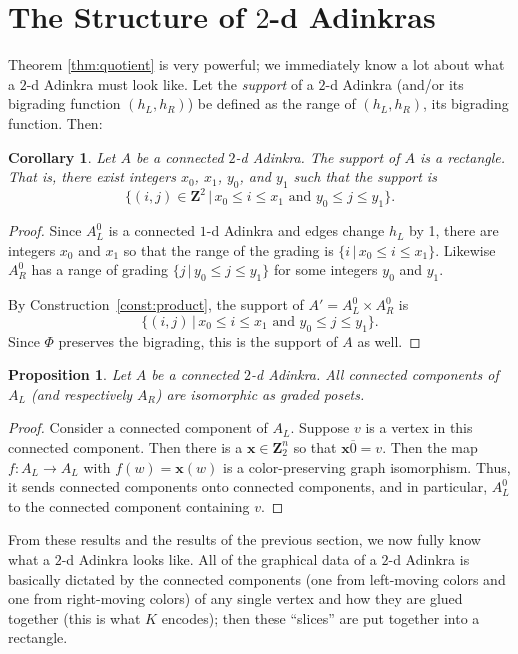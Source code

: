 \documentclass[12pt,twoside,singlespace]{article}
\numberwithin{equation}{section}
\newtheorem{cor}[equation]{Corollary}
\newtheorem{prop}[equation]{Proposition}
\theoremstyle{definition}
\newcommand{\ZZ}{\mathbf{Z}}
\renewcommand{\vec}[1]{\mathbf{#1}}
\begin{document}
\section{The Structure of $2$-d Adinkras}
\label{sec:structure}
Theorem \ref{thm:quotient} is very powerful; we immediately know a lot about what a $2$-d Adinkra must look like. Let the \emph{support} of a $2$-d Adinkra (and/or its bigrading function $(h_L,h_R)$) be defined as the range of $(h_L,h_R)$, its bigrading function. Then:
\begin{cor}
\label{cor:rectangle}
Let $A$ be a connected $2$-d Adinkra.  The support of $A$ is a rectangle.  That is, there exist integers $x_0$, $x_1$, $y_0$, and $y_1$ such that the support is
\[\{(i,j)\in\ZZ^2\,|\,x_0 \le i\le x_1\mbox{ and }y_0\le j\le y_1\}.\]
\end{cor}
\begin{proof}
Since $A_L^0$ is a connected $1$-d Adinkra and edges change $h_L$ by 1, there are integers $x_0$ and $x_1$ so that the range of the grading is $\{i\,|\,x_0\le i\le x_1\}$.  Likewise $A_R^0$ has a range of grading $\{j\,|\,y_0\le j\le y_1\}$ for some integers $y_0$ and $y_1$.

By Construction~\ref{const:product}, the support of $A'=A_L^0\times A_R^0$ is
\[\{(i,j)\,|\,x_0\le i\le x_1\mbox{ and }y_0\le j\le y_1\}.\]
Since $\Phi$ preserves the bigrading, this is the support of $A$ as well.
\end{proof}


\begin{prop}
\label{prop:componentsiso}
Let $A$ be a connected $2$-d Adinkra.  All connected components of $A_L$ (and respectively $A_R$) are isomorphic as graded posets.
\end{prop}
\begin{proof}
Consider a connected component of $A_L$.  Suppose $v$ is a vertex in this connected component.  Then there is a $\vec{x}\in\ZZ_2^n$ so that $\vec{x}\overline{0}=v$.  Then the map $f:A_L\to A_L$ with $f(w)=\vec{x}(w)$ is a color-preserving graph isomorphism.  Thus, it sends connected components onto connected components, and in particular, $A_L^0$ to the connected component containing $v$.
\end{proof}

From these results and the results of the previous section, we now fully know what a $2$-d Adinkra looks like. All of the graphical data of a $2$-d Adinkra is basically dictated by the connected components (one from left-moving colors and one from right-moving colors) of any single vertex and how they are glued together (this is what $K$ encodes); then these ``slices'' are put together into a rectangle.
\end{document}
